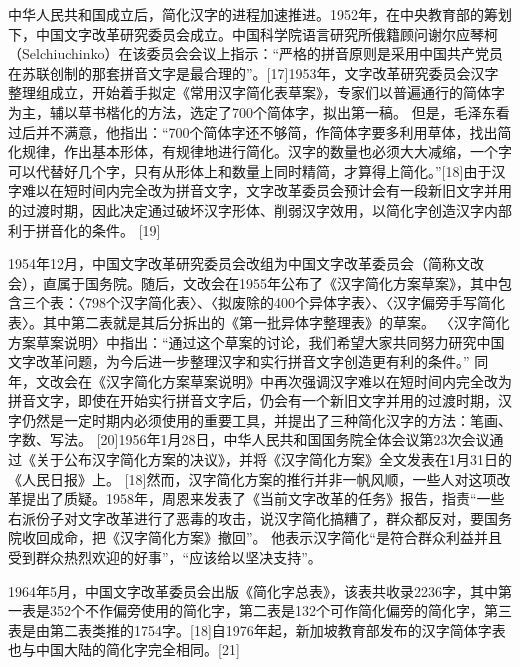 中华人民共和国成立后，简化汉字的进程加速推进。1952年，在中央教育部的筹划下，中国文字改革研究委员会成立。中国科学院语言研究所俄籍顾问谢尔应琴柯（Selchiuchinko）在该委员会会议上指示：“严格的拼音原则是采用中国共产党员在苏联创制的那套拼音文字是最合理的”。[17]1953年，文字改革研究委员会汉字整理组成立，开始着手拟定《常用汉字简化表草案》，专家们以普遍通行的简体字为主，辅以草书楷化的方法，选定了700个简体字，拟出第一稿。 但是，毛泽东看过后并不满意，他指出：“700个简体字还不够简，作简体字要多利用草体，找出简化规律，作出基本形体，有规律地进行简化。汉字的数量也必须大大减缩，一个字可以代替好几个字，只有从形体上和数量上同时精简，才算得上简化。”[18]由于汉字难以在短时间内完全改为拼音文字，文字改革委员会预计会有一段新旧文字并用的过渡时期，因此决定通过破坏汉字形体、削弱汉字效用，以简化字创造汉字内部利于拼音化的条件。 [19]

1954年12月，中国文字改革研究委员会改组为中国文字改革委员会（简称文改会），直属于国务院。随后，文改会在1955年公布了《汉字简化方案草案》，其中包含三个表：〈798个汉字简化表〉、〈拟废除的400个异体字表〉、〈汉字偏旁手写简化表〉。其中第二表就是其后分拆出的《第一批异体字整理表》的草案。 〈汉字简化方案草案说明〉中指出：“通过这个草案的讨论，我们希望大家共同努力研究中国文字改革问题，为今后进一步整理汉字和实行拼音文字创造更有利的条件。” 同年，文改会在《汉字简化方案草案说明》中再次强调汉字难以在短时间内完全改为拼音文字，即使在开始实行拼音文字后，仍会有一个新旧文字并用的过渡时期，汉字仍然是一定时期内必须使用的重要工具，并提出了三种简化汉字的方法：笔画、字数、写法。 [20]1956年1月28日，中华人民共和国国务院全体会议第23次会议通过《关于公布汉字简化方案的决议》，并将《汉字简化方案》全文发表在1月31日的《人民日报》上。 [18]然而，汉字简化方案的推行并非一帆风顺，一些人对这项改革提出了质疑。1958年，周恩来发表了《当前文字改革的任务》报告，指责“一些右派份子对文字改革进行了恶毒的攻击，说汉字简化搞糟了，群众都反对，要国务院收回成命，把《汉字简化方案》撤回”。 他表示汉字简化“是符合群众利益并且受到群众热烈欢迎的好事”，“应该给以坚决支持”。

1964年5月，中国文字改革委员会出版《简化字总表》，该表共收录2236字，其中第一表是352个不作偏旁使用的简化字，第二表是132个可作简化偏旁的简化字，第三表是由第二表类推的1754字。[18]自1976年起，新加坡教育部发布的汉字简体字表也与中国大陆的简化字完全相同。[21] 

